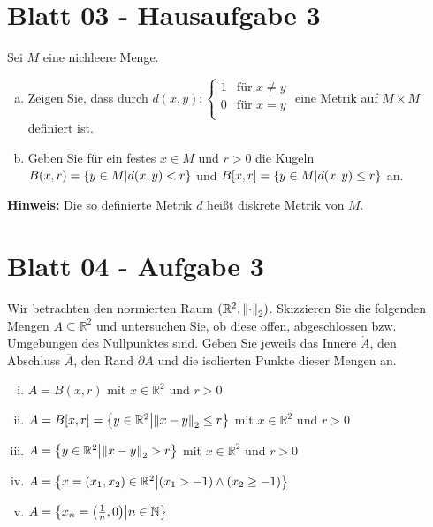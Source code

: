 \documentclass{scrreprt}
\begin{document}
\section{Blatt 03 - Hausaufgabe 3}

Sei $M$ eine nichleere Menge.
\begin{enumerate}[a)]
\item Zeigen Sie, dass durch $d(x, y) \colon \begin{cases}
    1 & \text{für $x \ne y$} \\
    0 & \text{für $x = y$} \\
  \end{cases}$ eine Metrik auf $M \times M$ definiert ist.

\item Geben Sie für ein festes $x \in M$ und $r > 0$ die Kugeln
  $B(x, r) = \qty{ y \in M \middle| d(x, y) < r}$ und
  $B[x, r] = \qty{ y \in M \middle| d(x, y) \leq r}$ an.

\end{enumerate}

\textbf{Hinweis:} Die so definierte Metrik $d$ heißt diskrete Metrik von $M$.

\section{Blatt 04 - Aufgabe 3}

Wir betrachten den normierten Raum $(\mathbb{R}^2, \norm{\cdot}_2)$.
Skizzieren Sie die folgenden Mengen $A \subseteq \mathbb{R}^2$ und untersuchen Sie,
ob diese offen, abgeschlossen bzw. Umgebungen des Nullpunktes sind.
Geben Sie jeweils das Innere $\mathring A$, den Abschluss $\overline{A}$,
den Rand $\partial A$ und die isolierten Punkte dieser Mengen an.

\begin{enumerate}[(i)]
\item $A = B(x, r)$ mit $x \in \mathbb{R}^2$ und $r > 0$
\item $A = B[x, r] = \qty{y \in \mathbb{R}^2 \middle| \norm{x - y}_2 \leq r}$ mit $x \in \mathbb{R}^2$ und $r > 0$
\item $A = \qty{y \in \mathbb{R}^2 \middle| \norm{x - y}_2 > r}$ mit $x \in \mathbb{R}^2$ und $r > 0$
\item $A = \qty{x = \qty(x_1, x_2) \in \mathbb{R}^2 \middle| \qty(x_1 > -1) \land \qty(x_2 \geq -1)}$
\item $A = \qty{ x_n = \qty(\frac{1}{n}, 0) \middle| n \in \mathbb{N}}$
\end{enumerate}
\end{document}
